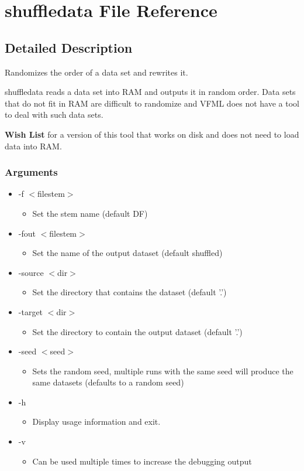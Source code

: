 \section{shuffledata File Reference}
\label{shuffledata}


\subsection{Detailed Description}
Randomizes the order of a data set and rewrites it. 

shuffledata reads a data set into RAM and outputs it in random order. Data sets that do not fit in RAM are difficult to randomize and VFML does not have a tool to deal with such data sets.

\begin{Desc}
\item[{\bf Wish List}]for a version of this tool that works on disk and does not need to load data into RAM. \end{Desc}
\subsubsection*{Arguments}

\begin{itemize}
\item -f $<$filestem$>$\begin{itemize}
\item Set the stem name (default DF)\end{itemize}
\item -fout $<$filestem$>$\begin{itemize}
\item Set the name of the output dataset (default shuffled)\end{itemize}
\item -source $<$dir$>$\begin{itemize}
\item Set the directory that contains the dataset (default '.')\end{itemize}
\item -target $<$dir$>$\begin{itemize}
\item Set the directory to contain the output dataset (default '.')\end{itemize}
\item -seed $<$seed$>$\begin{itemize}
\item Sets the random seed, multiple runs with the same seed will produce the same datasets (defaults to a random seed)\end{itemize}
\item -h\begin{itemize}
\item Display usage information and exit.\end{itemize}
\item -v\begin{itemize}
\item Can be used multiple times to increase the debugging output\end{itemize}
\end{itemize}


